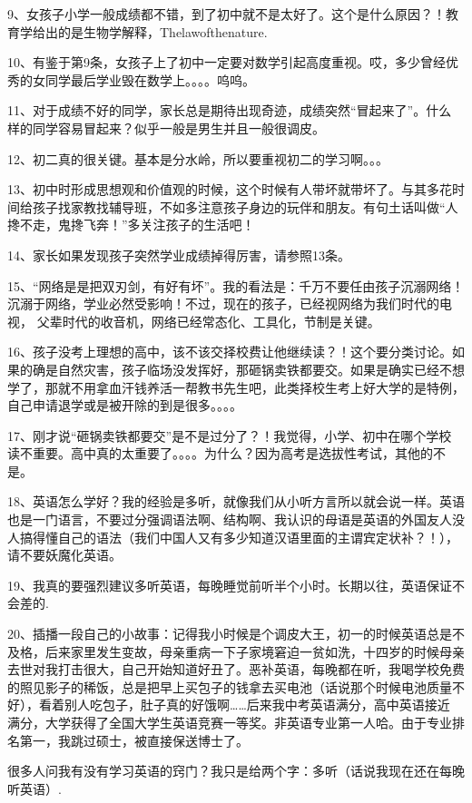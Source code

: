 \documentclass[11pt]{ctexart}
\begin{document}
{{{{9、女孩子小学一般成绩都不错，到了初中就不是太好了。这个是什么原因？！教
育学给出的是生物学解释，Thelawofthenature.


10、有鉴于第9条，女孩子上了初中一定要对数学引起高度重视。哎，多少曾经优
秀的女同学最后学业毁在数学上。。。。呜呜。


11、对于成绩不好的同学，家长总是期待出现奇迹，成绩突然“冒起来了”。什么
样的同学容易冒起来？似乎一般是男生并且一般很调皮。


12、初二真的很关键。基本是分水岭，所以要重视初二的学习啊。。。

13、初中时形成思想观和价值观的时候，这个时候有人带坏就带坏了。与其多花时
间给孩子找家教找辅导班，不如多注意孩子身边的玩伴和朋友。有句土话叫做“人
搀不走，鬼搀飞奔！”多关注孩子的生活吧！


14、家长如果发现孩子突然学业成绩掉得厉害，请参照13条。

15、“网络是是把双刃剑，有好有坏”。我的看法是：千万不要任由孩子沉溺网络！
沉溺于网络，学业必然受影响！不过，现在的孩子，已经视网络为我们时代的电视，
父辈时代的收音机，网络已经常态化、工具化，节制是关键。


16、孩子没考上理想的高中，该不该交择校费让他继续读？！这个要分类讨论。如
果的确是自然灾害，孩子临场没发挥好，那砸锅卖铁都要交。如果是确实已经不想
学了，那就不用拿血汗钱养活一帮教书先生吧，此类择校生考上好大学的是特例，
自己申请退学或是被开除的到是很多。。。。


17、刚才说“砸锅卖铁都要交”是不是过分了？！我觉得，小学、初中在哪个学校
读不重要。高中真的太重要了。。。。为什么？因为高考是选拔性考试，其他的不
是。


18、英语怎么学好？我的经验是多听，就像我们从小听方言所以就会说一样。英语也是一门语言，不要过分强调语法啊、结构啊、我认识的母语是英语的外国友人没人搞得懂自己的语法（我们中国人又有多少知道汉语里面的主谓宾定状补？！），请不要妖魔化英语。

19、我真的要强烈建议多听英语，每晚睡觉前听半个小时。长期以往，英语保证不会差的.

20、插播一段自己的小故事：记得我小时候是个调皮大王，初一的时候英语总是不
及格，后来家里发生变故，母亲重病一下子家境窘迫一贫如洗，十四岁的时候母亲
去世对我打击很大，自己开始知道好丑了。恶补英语，每晚都在听，我喝学校免费
的照见影子的稀饭，总是把早上买包子的钱拿去买电池（话说那个时候电池质量不
好），看着别人吃包子，肚子真的好饿啊……后来我中考英语满分，高中英语接近
满分，大学获得了全国大学生英语竞赛一等奖。非英语专业第一人哈。由于专业排
名第一，我跳过硕士，被直接保送博士了。


很多人问我有没有学习英语的窍门？我只是给两个字：多听（话说我现在还在每晚
听英语）.


}}}}
\end{document}
